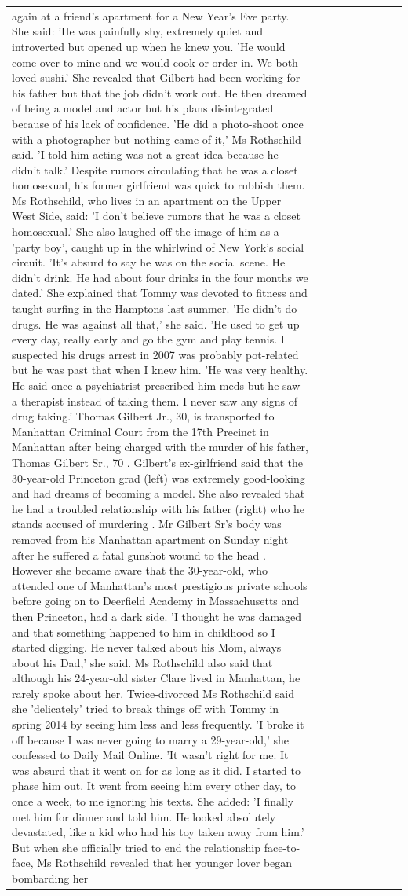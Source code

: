 \begin{table}[H]
\begin{tabular}{lllrlllll}
again at a friend’s apartment for a New Year’s Eve party. She said: 'He was painfully shy, extremely quiet and introverted but opened up when he knew you. 'He would come over to mine and we would cook or order in. We both loved sushi.' She revealed that Gilbert had been working for his father but that the job didn't work out. He then dreamed of being a model and actor but his plans disintegrated because of his lack of confidence. 'He did a photo-shoot once with a photographer but nothing came of it,' Ms Rothschild said. 'I told him acting was not a great idea because he didn’t talk.' Despite rumors circulating that he was a closet homosexual, his former girlfriend was quick to rubbish them. Ms Rothschild, who lives in an apartment on the Upper West Side, said: 'I don’t believe rumors that he was a closet homosexual.' She also laughed off the image of him as a 'party boy', caught up in the whirlwind of New York's social circuit. 'It’s absurd to say he was on the social scene. He didn’t drink. He had about four drinks in the four months we dated.' She explained that Tommy was devoted to fitness and taught surfing in the Hamptons last summer. 'He didn’t do drugs. He was against all that,' she said. 'He used to get up every day, really early and go the gym and play tennis. I suspected his drugs arrest in 2007 was probably pot-related but he was past that when I knew him. 'He was very healthy. He said once a psychiatrist prescribed him meds but he saw a therapist instead of taking them. I never saw any signs of drug taking.' Thomas Gilbert Jr., 30, is transported to Manhattan Criminal Court from the 17th Precinct in Manhattan after being charged with the murder of his father, Thomas Gilbert Sr., 70 . Gilbert's ex-girlfriend said that the 30-year-old Princeton grad (left) was extremely good-looking and had dreams of becoming a model. She also revealed that he had a troubled relationship with his father (right) who he stands accused of murdering . Mr Gilbert Sr's body was removed from his Manhattan apartment on Sunday night after he suffered a fatal gunshot wound to the head . However she became aware that the 30-year-old, who attended one of Manhattan's most prestigious private schools before going on to Deerfield Academy in Massachusetts and then Princeton, had a dark side. 'I thought he was damaged and that something happened to him in childhood so I started digging. He never talked about his Mom, always about his Dad,' she said. Ms Rothschild also said that although his 24-year-old sister Clare lived in Manhattan, he rarely spoke about her. Twice-divorced Ms Rothschild said she 'delicately' tried to break things off with Tommy in spring 2014 by seeing him less and less frequently. 'I broke it off because I was never going to marry a 29-year-old,' she confessed to Daily Mail Online. 'It wasn’t right for me. It was absurd that it went on for as long as it did. I started to phase him out. It went from seeing him every other day, to once a week, to me ignoring his texts. She added: 'I finally met him for dinner and told him. He looked absolutely devastated, like a kid who had his toy taken away from him.' But when she officially tried to end the relationship face-to-face, Ms Rothschild revealed that her younger lover began bombarding her 
\end{tabular}
\end{table}
